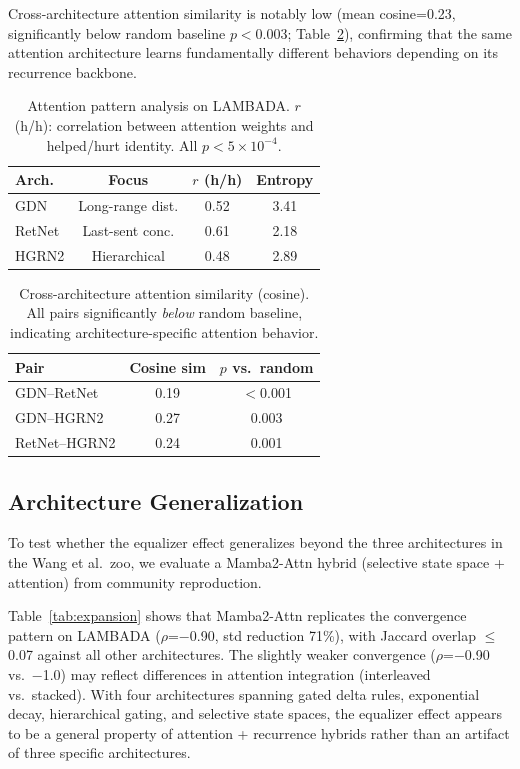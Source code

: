 \documentclass[11pt,twocolumn,a4paper]{article}
\begin{document}
Cross-architecture attention similarity is notably low (mean cosine=0.23, significantly below random baseline $p < 0.003$; Table~\ref{tab:attn-sim}), confirming that the same attention architecture learns fundamentally different behaviors depending on its recurrence backbone.

\begin{table}[t]
\centering
\small
\begin{tabular}{lccc}
\toprule
\textbf{Arch.} & \textbf{Focus} & \textbf{$r$ (h/h)} & \textbf{Entropy} \\
\midrule
GDN & Long-range dist. & 0.52 & 3.41 \\
RetNet & Last-sent conc. & 0.61 & 2.18 \\
HGRN2 & Hierarchical & 0.48 & 2.89 \\
\bottomrule
\end{tabular}
\caption{Attention pattern analysis on LAMBADA. $r$ (h/h): correlation between attention weights and helped/hurt identity. All $p < 5 \times 10^{-4}$.}
\label{tab:attention}
\end{table}

\begin{table}[t]
\centering
\small
\begin{tabular}{lcc}
\toprule
\textbf{Pair} & \textbf{Cosine sim} & \textbf{$p$ vs.\ random} \\
\midrule
GDN--RetNet & 0.19 & $<$0.001 \\
GDN--HGRN2 & 0.27 & 0.003 \\
RetNet--HGRN2 & 0.24 & 0.001 \\
\bottomrule
\end{tabular}
\caption{Cross-architecture attention similarity (cosine). All pairs significantly \emph{below} random baseline, indicating architecture-specific attention behavior.}
\label{tab:attn-sim}
\end{table}

\subsection{Architecture Generalization}
\label{sec:expansion}

To test whether the equalizer effect generalizes beyond the three architectures in the Wang et al.\ zoo, we evaluate a Mamba2-Attn hybrid (selective state space + attention) from community reproduction.

Table~\ref{tab:expansion} shows that Mamba2-Attn replicates the convergence pattern on LAMBADA ($\rho$=$-$0.90, std reduction 71\%), with Jaccard overlap $\leq$ 0.07 against all other architectures. The slightly weaker convergence ($\rho$=$-$0.90 vs.\ $-$1.0) may reflect differences in attention integration (interleaved vs.\ stacked). With four architectures spanning gated delta rules, exponential decay, hierarchical gating, and selective state spaces, the equalizer effect appears to be a general property of attention + recurrence hybrids rather than an artifact of three specific architectures.
\end{document}
